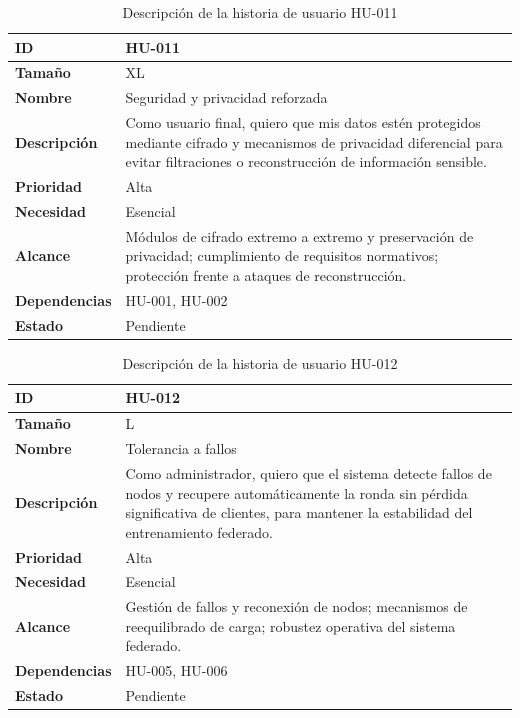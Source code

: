 \documentclass{report}
\begin{document}
\begin{table}[H]
\centering
\caption{Descripción de la historia de usuario HU-011}
\label{tab:hu011}
\begin{tabular}{|l|p{12cm}|}
\hline
\textbf{ID} & HU-011 \\ \hline
\textbf{Tamaño} & XL \\ \hline
\textbf{Nombre} & Seguridad y privacidad reforzada \\ \hline
\textbf{Descripción} & 
Como usuario final, quiero que mis datos estén protegidos mediante cifrado y mecanismos de privacidad diferencial para evitar filtraciones o reconstrucción de información sensible. \\ \hline
\textbf{Prioridad} & Alta \\ \hline
\textbf{Necesidad} & Esencial \\ \hline
\textbf{Alcance} & Módulos de cifrado extremo a extremo y preservación de privacidad; cumplimiento de requisitos normativos; protección frente a ataques de reconstrucción. \\ \hline
\textbf{Dependencias} & HU-001, HU-002 \\ \hline
\textbf{Estado} & Pendiente \\ \hline
\end{tabular}
\end{table}



\begin{table}[H]
\centering
\caption{Descripción de la historia de usuario HU-012}
\label{tab:hu012}
\begin{tabular}{|l|p{12cm}|}
\hline
\textbf{ID} & HU-012 \\ \hline
\textbf{Tamaño} & L \\ \hline
\textbf{Nombre} & Tolerancia a fallos \\ \hline
\textbf{Descripción} & 
Como administrador, quiero que el sistema detecte fallos de nodos y recupere automáticamente la ronda sin pérdida significativa de clientes, para mantener la estabilidad del entrenamiento federado. \\ \hline
\textbf{Prioridad} & Alta \\ \hline
\textbf{Necesidad} & Esencial \\ \hline
\textbf{Alcance} & Gestión de fallos y reconexión de nodos; mecanismos de reequilibrado de carga; robustez operativa del sistema federado. \\ \hline
\textbf{Dependencias} & HU-005, HU-006 \\ \hline
\textbf{Estado} & Pendiente \\ \hline
\end{tabular}
\end{table}
\end{document}
